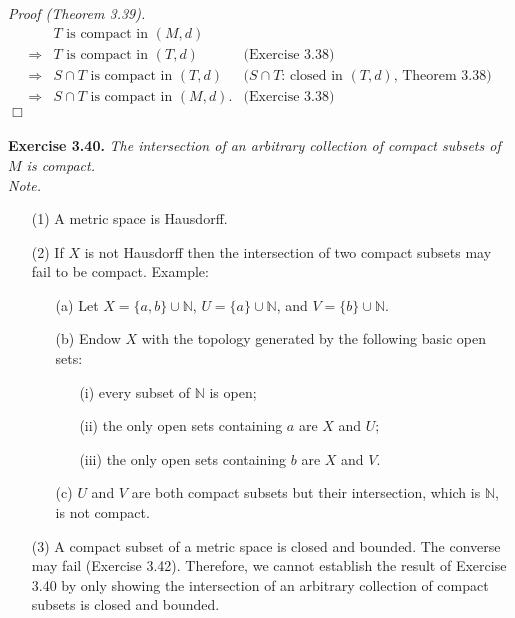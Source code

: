 \documentclass{article}
\begin{document}
\emph{Proof (Theorem 3.39).}
\begin{align*}
&\text{$T$ is compact in $(M,d)$} \\
\Longrightarrow&
\text{$T$ is compact in $(T,d)$}
  &\text{(Exercise 3.38)} \\
\Longrightarrow&
\text{$S \cap T$ is compact in $(T,d)$}
  &\text{($S \cap T$: closed in $(T,d)$, Theorem 3.38)} \\
\Longrightarrow&
\text{$S \cap T$ is compact in $(M,d)$}.
  &\text{(Exercise 3.38)}
\end{align*}
$\Box$ \\\\






\textbf{Exercise 3.40.}
\emph{The intersection of an arbitrary collection of compact subsets of $M$ is compact.} \\

\emph{Note.}
\begin{enumerate}
\item[(1)]
A metric space is Hausdorff.
\item[(2)]
If $X$ is not Hausdorff then the intersection of two compact subsets may fail to be compact.
Example:
  \begin{enumerate}
  \item[(a)]
  Let $X = \{ a, b \} \cup \mathbb{N}$,
  $U = \{ a \} \cup \mathbb{N}$,
  and $V = \{ b \} \cup \mathbb{N}$.
  \item[(b)]
  Endow $X$ with the topology generated by the following basic open sets:
    \begin{enumerate}
    \item[(i)]
    every subset of $\mathbb{N}$ is open;
    \item[(ii)]
    the only open sets containing $a$ are $X$ and $U$;
    \item[(iii)]
    the only open sets containing $b$ are $X$ and $V$.
    \end{enumerate}
  \item[(c)]
  $U$ and $V$ are both compact subsets but their intersection,
  which is $\mathbb{N}$, is not compact.
  \end{enumerate}
\item[(3)]
A compact subset of a metric space is closed and bounded.
The converse may fail (Exercise 3.42).
Therefore,
we cannot establish the result of Exercise 3.40
by only showing
the intersection of an arbitrary collection of compact subsets is closed and bounded. \\
\end{enumerate}
\end{document}
